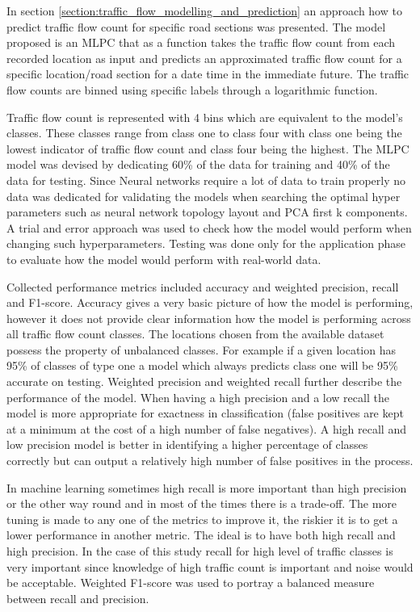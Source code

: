\documentclass[12pt, a4paper]{report}
\theoremstyle{definition}
\theoremstyle{definition}%
\theoremstyle{definition}%
\theoremstyle{definition}%
\theoremstyle{definition}%
\theoremstyle{definition}%
\begin{document}
In section \ref{section:traffic_flow_modelling_and_prediction} an approach how to predict traffic flow count for specific road sections was presented. The model proposed is an MLPC that as a function takes the traffic flow count from each recorded location as input and predicts an approximated traffic flow count for a specific location/road section for a date time in the immediate future. The traffic flow counts are binned using specific labels through a logarithmic function. 

Traffic flow count is represented with 4 bins which are equivalent to the model's classes. These classes range from class one to class four with class one being the lowest indicator of traffic flow count and class four being the highest. The MLPC model was devised by dedicating 60\% of the data for training and 40\% of the data for testing. Since Neural networks require a lot of data to train properly no data was dedicated for validating the models when searching the optimal hyper  parameters such as neural network topology layout and PCA first k components. A trial and error approach was used to check how the model would perform when changing such hyperparameters. Testing was done only for the application phase to evaluate how the model would perform with real-world data. 

Collected performance metrics included accuracy and weighted precision, recall and F1-score. Accuracy gives a very basic picture of how the model is performing, however it does not provide clear information how the model is performing across all traffic flow count classes. The locations chosen from the available dataset possess the property of unbalanced classes. For example if a given location has 95\% of classes of type one a model which always predicts class one will be 95\% accurate on testing. Weighted precision and weighted recall further describe the performance of the model. When having a high precision and a low recall the model is more appropriate for exactness in classification (false positives are kept at a minimum at the cost of a high number of false negatives). A high recall and low precision model is better in identifying  a higher percentage of classes correctly but can output a relatively high number of false positives in the process.   

In machine learning sometimes high recall is more important than high precision or the other way round and in most of the times there is a trade-off. The more tuning is made to any one of the metrics to improve it, the riskier it is to get a lower performance in another metric.  The ideal is to have both high recall and high precision. In the case of this study recall for high level of traffic classes is very important since knowledge of high traffic count is important and noise would be acceptable. Weighted F1-score was used to portray a balanced measure between recall and precision.
\end{document}
